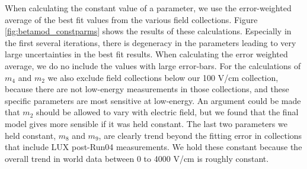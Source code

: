 When calculating the constant value of a parameter, we use the error-weighted average of the best fit values from the various field collections. Figure \ref{fig:betamod_constparms} shows the results of these calculations. Especially in the first several iterations, there is degeneracy in the parameters leading to very large uncertainties in the best fit results. When calculating the error weighted average, we do no include the values with large error-bars. For the calculations of $m_4$ and $m_2$ we also exclude field collections below our 100 V/cm collection, because there are not low-energy measurements in those collections, and these specific parameters are most sensitive at low-energy. An argument could be made that $m_2$ should be allowed to vary with electric field, but we found that the final model gives more sensible if it was held constant. The last two parameters we held constant, $m_8$ and $m_9$, are clearly trend beyond the fitting error in collections that include LUX post-Run04 measurements. We hold these constant because the overall trend in world data between 0 to 4000 V/cm is roughly constant.
